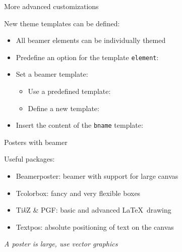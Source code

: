 \begin{frame}{More advanced customizations}

	New theme templates can be defined:
	\begin{itemize}
		\item All beamer elements can be individually themed
		\item Predefine an option for the template {\tt element}: 
	\item Set a beamer template: 
		\begin{itemize}
			\item Use a predefined template: 
			\item Define a new template: 
		\end{itemize}
	\item Insert the content of the {\tt bname} template: 
	\end{itemize}
		
\end{frame}


\begin{frame}{Posters with beamer}

	Useful packages:
	\begin{itemize}\bigsep 
		\item Beamerposter: beamer with support for large canvas
		\item Tcolorbox: fancy and very flexible boxes
		\item Ti{\em k}Z \& PGF: basic and advanced \LaTeX~drawing 
		\item Textpos: absolute positioning of text on the canvas
	\end{itemize}
	\pause\bigskip 

	\center \em
	A poster is large, use vector graphics

\end{frame}


\thankframe



